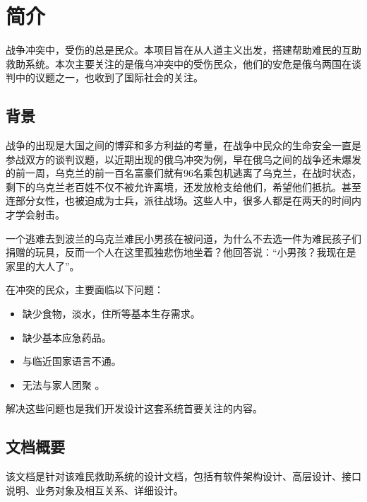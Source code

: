 \chapter{简介}

战争冲突中，受伤的总是民众。本项目旨在从人道主义出发，搭建帮助难民的互助救助系统。本次主要关注的是俄乌冲突中的受伤民众，他们的安危是俄乌两国在谈判中的议题之一，也收到了国际社会的关注。
\\
\section{背景}

战争的出现是大国之间的博弈和多方利益的考量，在战争中民众的生命安全一直是参战双方的谈判议题，以近期出现的俄乌冲突为例，早在俄乌之间的战争还未爆发的前一周，乌克兰的前一百名富豪们就有96名乘包机逃离了乌克兰，在战时状态，剩下的乌克兰老百姓不仅不被允许离境，还发放枪支给他们，希望他们抵抗。甚至连部分女性，也被迫成为士兵，派往战场。这些人中，很多人都是在两天的时间内才学会射击。

一个逃难去到波兰的乌克兰难民小男孩在被问道，为什么不去选一件为难民孩子们捐赠的玩具，反而一个人在这里孤独悲伤地坐着？他回答说：“小男孩？我现在是家里的大人了”。

在冲突的民众，主要面临以下问题：

\begin{itemize}
\item 缺少食物，淡水，住所等基本生存需求。
\item 缺少基本应急药品。
\item 与临近国家语言不通。
\item 无法与家人团聚 。
\end{itemize}

解决这些问题也是我们开发设计这套系统首要关注的内容。
\\
\section{文档概要}

该文档是针对该难民救助系统的设计文档，包括有软件架构设计、高层设计、接口说明、业务对象及相互关系、详细设计。

